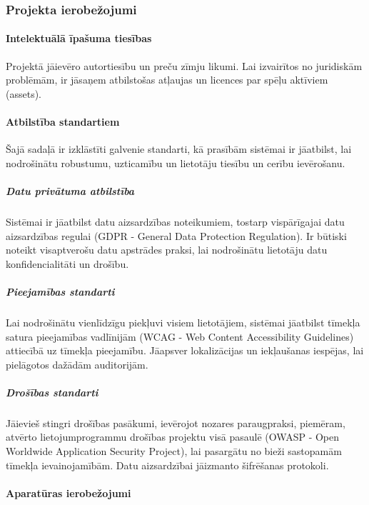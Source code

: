 \subsubsection{Projekta ierobežojumi}

\paragraph{Intelektuālā īpašuma tiesības}

    Projektā jāievēro autortiesību un preču zīmju likumi. Lai izvairītos no
    juridiskām problēmām, ir jāsaņem atbilstošas atļaujas un licences par spēļu
    aktīviem (assets).

\paragraph{Atbilstība standartiem}

    Šajā sadaļā ir izklāstīti galvenie standarti, kā prasībām sistēmai ir
    jāatbilst, lai nodrošinātu robustumu, uzticamību un lietotāju tiesību un
    cerību ievērošanu.

    \subparagraph{Datu privātuma atbilstība}

        Sistēmai ir jāatbilst datu aizsardzības noteikumiem, tostarp
        vispārīgajai datu aizsardzības regulai (GDPR - General Data Protection
        Regulation). Ir būtiski noteikt visaptverošu datu apstrādes praksi, lai
        nodrošinātu lietotāju datu konfidencialitāti un drošību.

    \subparagraph{Pieejamības standarti}

        Lai nodrošinātu vienlīdzīgu piekļuvi visiem lietotājiem, sistēmai
        jāatbilst tīmekļa satura pieejamības vadlīnijām (WCAG - Web Content
        Accessibility Guidelines) attiecībā uz tīmekļa pieejamību. Jāapsver
        lokalizācijas un iekļaušanas iespējas, lai pielāgotos dažādām
        auditorijām.

    \subparagraph{Drošības standarti}

        Jāievieš stingri drošības pasākumi, ievērojot nozares paraugpraksi,
        piemēram, atvērto lietojumprogrammu drošības projektu visā pasaulē
        (OWASP - Open Worldwide Application Security Project), lai pasargātu no
        bieži sastopamām tīmekļa ievainojamībām. Datu aizsardzībai jāizmanto
        šifrēšanas protokoli.

\paragraph{Aparatūras ierobežojumi}


